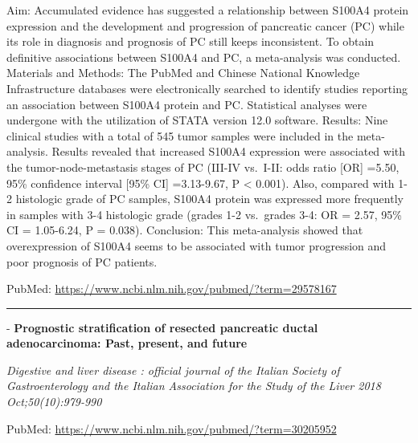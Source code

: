 \documentclass[]{article}
\begin{document}
Aim: Accumulated evidence has suggested a relationship between S100A4
protein expression and the development and progression of pancreatic
cancer (PC) while its role in diagnosis and prognosis of PC still keeps
inconsistent. To obtain definitive associations between S100A4 and PC, a
meta-analysis was conducted. Materials and Methods: The PubMed and
Chinese National Knowledge Infrastructure databases were electronically
searched to identify studies reporting an association between S100A4
protein and PC. Statistical analyses were undergone with the utilization
of STATA version 12.0 software. Results: Nine clinical studies with a
total of 545 tumor samples were included in the meta-analysis. Results
revealed that increased S100A4 expression were associated with the
tumor-node-metastasis stages of PC (III-IV vs.~I-II: odds ratio {[}OR{]}
=5.50, 95\% confidence interval {[}95\% CI{]} =3.13-9.67, P \textless{}
0.001). Also, compared with 1-2 histologic grade of PC samples, S100A4
protein was expressed more frequently in samples with 3-4 histologic
grade (grades 1-2 vs.~grades 3-4: OR = 2.57, 95\% CI = 1.05-6.24, P =
0.038). Conclusion: This meta-analysis showed that overexpression of
S100A4 seems to be associated with tumor progression and poor prognosis
of PC patients.

PubMed: \url{https://www.ncbi.nlm.nih.gov/pubmed/?term=29578167}

{}

{}

\begin{center}\rule{0.5\linewidth}{\linethickness}\end{center}

 - \textbf{Prognostic stratification of resected pancreatic ductal
adenocarcinoma: Past, present, and future}

\emph{Digestive and liver disease : official journal of the Italian
Society of Gastroenterology and the Italian Association for the Study of
the Liver 2018 Oct;50(10):979-990}

PubMed: \url{https://www.ncbi.nlm.nih.gov/pubmed/?term=30205952}
\end{document}
